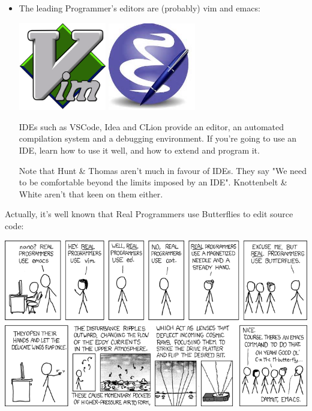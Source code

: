 \documentclass[aspectratio=169]{beamer}
\begin{document}
\begin{frame}
  \begin{itemize}
    \item
       The leading Programmer's editors are (probably) \alert{vim} and \alert{emacs}:

\includegraphics[width=0.3\textwidth]{vimLogo}
\includegraphics[width=0.3\textwidth]{emacsLogo}

    \pitem IDEs such as \alert{VSCode}, \alert{Idea} and \alert{CLion}
          provide an editor, an automated compilation system
	  and a debugging environment.
	  If you're going to use an IDE,
          learn how to use it well, and
          how to extend and program it.

     \pitem
     Note that \alert{Hunt \& Thomas} aren't much in favour of IDEs.
     They say "We need to be comfortable beyond the limits imposed by an IDE".
     Knottenbelt \& White aren't that keen on them either.
  \end{itemize}
\end{frame}

\begin{frame}
Actually, it's well known that \alert{Real Programmers use Butterflies}
to edit source code:

\centering
\vspace{10pt}
\includegraphics[height=0.8\textheight]{real_programmers.png}

\end{frame}
\end{document}
